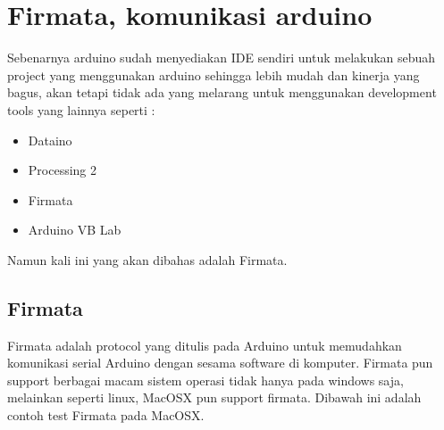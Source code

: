 
\section{Firmata, komunikasi arduino}
	Sebenarnya arduino sudah menyediakan IDE sendiri untuk melakukan sebuah project yang menggunakan arduino sehingga lebih mudah dan kinerja yang bagus, akan tetapi tidak ada yang melarang untuk menggunakan development tools yang lainnya seperti :
	\begin{itemize}
		\item Dataino
		\item Processing 2
		\item Firmata
		\item Arduino VB Lab
	\end{itemize}
	Namun kali ini yang akan dibahas adalah Firmata.
	
	\subsection{Firmata}
	Firmata adalah protocol yang ditulis pada Arduino untuk memudahkan komunikasi serial Arduino dengan sesama software di komputer. Firmata pun support berbagai macam sistem operasi tidak hanya pada windows saja, melainkan seperti linux, MacOSX pun support firmata. Dibawah ini adalah contoh test Firmata pada MacOSX.
	
